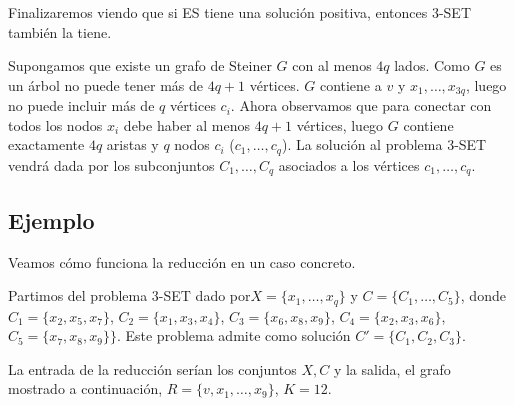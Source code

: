 \documentclass[a4paper, 11pt]{article}
\begin{document}
Finalizaremos viendo que si ES tiene una solución positiva, entonces 3-SET también la tiene.

Supongamos que existe un grafo de Steiner $G$ con al menos $4q$ lados. Como $G$ es un árbol no puede tener más de $4q+1$ vértices. $G$ contiene a $v$ y $x_1,\dots,x_{3q}$, luego no puede incluir más de $q$ vértices $c_i$. Ahora observamos que para conectar con todos los nodos $x_i$ debe haber al menos $4q+1$ vértices, luego $G$ contiene exactamente $4q$ aristas y $q$ nodos $c_i$ ($c_1,\dots,c_q$). La solución al problema 3-SET vendrá dada por los subconjuntos $C_1,\dots,C_q$ asociados a los vértices $c_1,\dots,c_q$.

\subsection*{Ejemplo}
Veamos cómo funciona la reducción en un caso concreto.

Partimos del problema 3-SET dado por$X=\{x_1,\dots,x_q\}$ y $C=\{C_1,\dots,C_5\}$, donde $C_1=\{x_2, x_5, x_7\}$, $C_2=\{x_1,x_3,x_4\}$, $C_3=\{x_6,x_8,x_9\}$, $C_4=\{x_2,x_3,x_6\}$, $C_5=\{x_7,x_8,x_9\}\}$. Este problema admite como solución $C'=\{C_1,C_2,C_3\}$.

La entrada de la reducción serían los conjuntos $X, C$ y la salida, el grafo mostrado a continuación, $R=\{v,x_1,\dots,x_9\}$, $K=12$.\\

%
\end{document}
